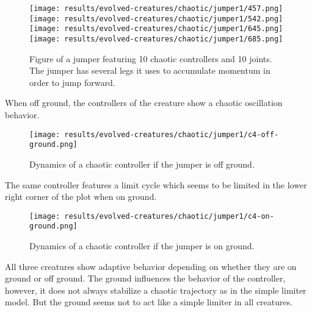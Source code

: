 \documentclass[main]{subfiles}
\begin{document}
\begin{figure}[H]
\centering
\texttt{[image: results/evolved-creatures/chaotic/jumper1/457.png]}
\texttt{[image: results/evolved-creatures/chaotic/jumper1/542.png]}
\texttt{[image: results/evolved-creatures/chaotic/jumper1/645.png]}
\texttt{[image: results/evolved-creatures/chaotic/jumper1/685.png]}
\caption[Figure of a jumper using chaotic controllers.]{Figure of a jumper featuring 10 chaotic controllers and 10 joints. The jumper has several legs it uses to accumulate momentum in order to jump forward.}
\label{figure:successfulcreatures-chaotic-crawler1}
\end{figure} 

When off ground, the controllers of the creature show a chaotic oscillation behavior. %

\begin{figure}[H]
\centering
\texttt{[image: results/evolved-creatures/chaotic/jumper1/c4-off-ground.png]}
\caption[Off ground controller dynamics of the crawler]{Dynamics of a chaotic controller if the jumper is off ground.}
\label{figure:crawler1-off-ground-controller-dynamics}
\end{figure}

The same controller features a limit cycle which seems to be limited in the lower right corner of the plot when on ground. %

\begin{figure}[H]
\centering
\texttt{[image: results/evolved-creatures/chaotic/jumper1/c4-on-ground.png]}
\caption[On ground controller dynamics of the crawler]{Dynamics of a chaotic controller if the jumper is on ground.}
\label{figure:crawler1-on-ground-controller-dynamics}
\end{figure}

All three creatures show adaptive behavior depending on whether they are on ground or off ground. %
%
The ground influences the behavior of the controller, however, it does not always stabilize a chaotic trajectory as in the simple limiter model. %
%
But the ground seems not to act like a simple limiter in all creatures. %
\end{document}

